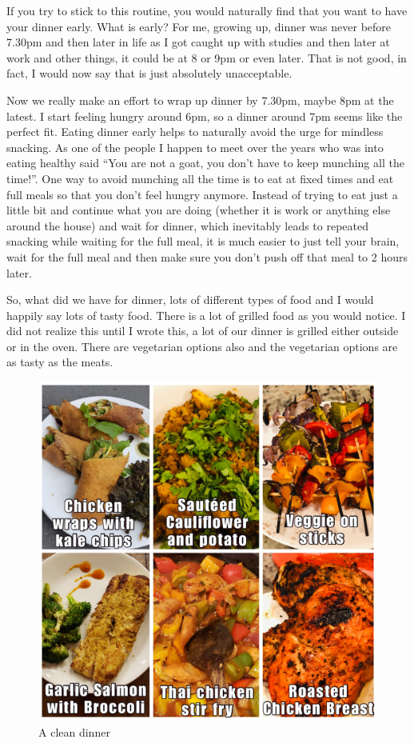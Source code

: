 \documentclass[
  oneside]{book}
\begin{document}
If you try to stick to this routine, you would naturally find that you want to have your dinner early. What is early? For me, growing up, dinner was never before 7.30pm and then later in life as I got caught up with studies and then later at work and other things, it could be at 8 or 9pm or even later. That is not good, in fact, I would now say that is just absolutely unacceptable.

Now we really make an effort to wrap up dinner by 7.30pm, maybe 8pm at the latest. I start feeling hungry around 6pm, so a dinner around 7pm seems like the perfect fit. Eating dinner early helps to naturally avoid the urge for mindless snacking. As one of the people I happen to meet over the years who was into eating healthy said ``You are not a goat, you don't have to keep munching all the time!''. One way to avoid munching all the time is to eat at fixed times and eat full meals so that you don't feel hungry anymore. Instead of trying to eat just a little bit and continue what you are doing (whether it is work or anything else around the house) and wait for dinner, which inevitably leads to repeated snacking while waiting for the full meal, it is much easier to just tell your brain, wait for the full meal and then make sure you don't push off that meal to 2 hours later.

So, what did we have for dinner, lots of different types of food and I would happily say lots of tasty food. There is a lot of grilled food as you would notice. I did not realize this until I wrote this, a lot of our dinner is grilled either outside or in the oven. There are vegetarian options also and the vegetarian options are as tasty as the meats.

\begin{figure}
\centering
\includegraphics{pictures/dinner1.JPG}
\caption{A clean dinner}
\end{figure}
\end{document}

